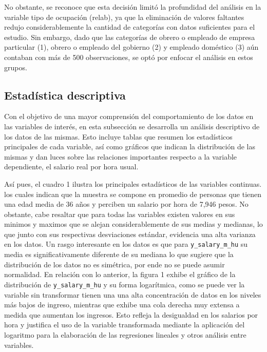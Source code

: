 \documentclass[10pt]{article}
\begin{document}
No obstante, se reconoce que esta decisión limitó la profundidad del análisis en la variable tipo de ocupación (relab), ya que la eliminación de valores faltantes redujo considerablemente la cantidad de categorías con datos suficientes para el estudio. Sin embargo, dado que las categorías de obrero o empleado de empresa particular (1), obrero o empleado del gobierno (2) y empleado doméstico (3) aún contaban con más de 500 observaciones, se optó por enfocar el análisis en estos grupos.

\subsection{Estadística descriptiva}
Con el objetivo de una mayor comprensión del comportamiento de los datos en las variables de interés, en esta subsección se desarrolla un análisis descriptivo de los datos de las mismas. Esto incluye tablas que resumen los estadísticos principales de cada variable, así como gráficos que indican la distribución de las mismas y dan luces sobre las relaciones importantes respecto a la variable dependiente, el salario real por hora usual. 



Así pues, el cuadro 1 ilustra los principales estadísticos de las variables continuas. los cuales indican que la muestra se compone en promedio de personas que tienen una edad media de 36 años y perciben un salario por hora de 7,946 pesos.
No obstante, cabe resaltar que para todas las variables existen valores  en sus minimos y maximos que se alejan considerablemente de sus medias y medianas, lo que junto con sus respectivas desviaciones estándar, evidencia una alta varianza en los datos. Un rasgo interesante en los datos es que para \texttt{y\_salary\_m\_hu} su media es significativamente diferente de su mediana lo que sugiere que la distribución de los datos no es simétrica, por ende no se puede asumir normalidad. En relación con lo anterior, la figura 1 exhibe el gráfico de la distribución de \texttt{y\_salary\_m\_hu} y su forma logarítmica, como se puede ver la variable sin transformar tienen una una alta concentración de datos en los niveles más bajos de ingreso, mientras que exhibe una cola derecha muy extensa a medida que  aumentan los ingresos. Esto refleja la desigualdad en los salarios por hora y justifica el uso de la variable transformada mediante la aplicación del logaritmo para la elaboración de las regresiones lineales y otros análisis entre variables.
\end{document}
